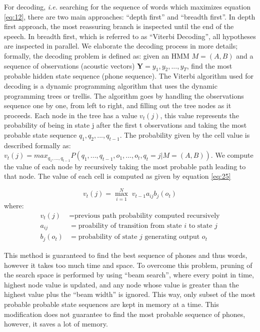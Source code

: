 For decoding, \textit{i.e.} searching for the sequence of words which maximizes equation \ref{eq:12}, there are two main approaches: \enquote{depth first} and \enquote{breadth first}. In depth first approach, the most reassuring branch is inspected until the end of the speech. In breadth first, which is referred to as \enquote{Viterbi Decoding}, all hypotheses are inspected in parallel. We elaborate the decoding process in more details; formally, the decoding problem is defined as: given an \ac{HMM} $M=(A,B)$ and a sequence of observations (acoustic vectors) $\mathbf{Y} = y_1,y_2,...,y_T$, find the most probable hidden state sequence (phone sequence). The Viterbi algorithm used for decoding is a dynamic programming algorithm that uses the dynamic programming trees or trellis. The algorithm goes by handling the observations sequence one by one, from left to right, and filling out the tree nodes as it proceeds. Each node in the tree has a value $v_t(j)$, this value represents the probability of being in state j after the first t observations and taking the most probable state sequence $q_1,q_2,...,q_{t-1}$. The probability given by the cell value is described formally as: $v_t(j) = max_{q_1,...,q_{t-1}} P(q_1,...,q_{t-1},o_1,...,o_t,q_t=j|M=(A,B))$. We compute the value of each node by recursively taking the most probable path leading to that node. The value of each cell is computed as given by equation \ref{eq:25}

\begin{equation}
	v_t(j) = \max_{i=1}^N \; v_{t-1} a_{ij} b_j(o_t)
\end{equation}
where:
\begin{align*}
	v_t(j) &= \text{previous path probability computed recursively}\\
	a_{ij} &= \text{proability of transition from state $i$ to state $j$}\\
	b_j(o_t) &= \text{probability of state $j$ generating output $o_t$}
\end{align*}

This method is guaranteed to find the best sequence of phones and thus words, however it takes too much time and space. To overcome this problem, pruning of the search space is performed by using \enquote{beam search}, where every point in time, highest node value is updated, and any node whose value is greater than the highest value plus the \enquote{beam width} is ignored. This way, only subset of the most probable probable state sequences are kept in memory at a time. This modification does not guarantee to find the most probable sequence of phones, however, it saves a lot of memory.


